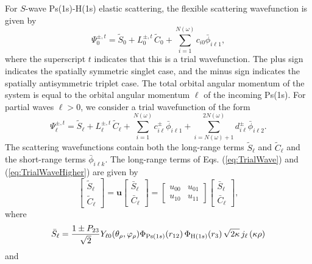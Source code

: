 \documentclass[preprint,showpacs,showkeys,preprintnumbers,amsmath,amssymb,longbibliography,pra,aps]{revtex4-1}
\begin{document}
For $S$-wave Ps(1s)-H(1s) elastic scattering, the flexible scattering
wavefunction is given by
\begin{equation}
\Psi_0^{\pm,t} = \widetilde{S}_0 + L_0^{\pm,t} \, \widetilde{C}_0
  + \sum_{i=1}^{N(\omega)} c_{i0} \bar{\phi}_{i\ell 1},
\label{eq:TrialWave}
\end{equation}
where the superscript $t$ indicates that this is a trial wavefunction. The plus
sign indicates the spatially symmetric singlet case, and the minus sign
indicates the spatially antisymmetric triplet case. The total orbital angular
momentum of the system is equal to the orbital angular momentum $\ell$ 
of the incoming Ps(1s). For partial waves $\ell > 0$, we consider a trial
wavefunction of the form
\begin{equation}
\Psi_\ell^{\pm,t} = \widetilde{S}_\ell + L^{\pm,t}_\ell \, \widetilde{C}_\ell
 + \sum_{i=1}^{N(\omega)} c_{i\ell}^\pm \bar{\phi}_{i\ell 1}
 + \!\!\!\sum_{i=N(\omega)+1}^{2N(\omega)} \!\! d_{i\ell}^\pm \bar{\phi}_{i\ell 2}.
\label{eq:TrialWaveHigher}
\end{equation}
The scattering wavefunctions contain both the long-range terms $\widetilde{S}_\ell$
and $\widetilde{C}_\ell$ and the short-range terms $\bar{\phi}_{i\ell k}$. The 
long-range terms of Eqs. (\ref{eq:TrialWave}) and (\ref{eq:TrialWaveHigher})
are given by
\begin{equation}
\label{eq:SCPhiDef}
\begin{bmatrix}
\widetilde{S}_\ell \\ \widetilde{C}_\ell
\end{bmatrix} = \textbf{u}  \begin{bmatrix}
\bar{S}_\ell \\ \bar{C}_\ell
\end{bmatrix} = \begin{bmatrix}
u_{00} & u_{01} \\  u_{10} & u_{11}
\end{bmatrix}
\begin{bmatrix}
\bar{S}_\ell \\ \bar{C}_\ell
\end{bmatrix}, 
\end{equation}
where
\begin{equation}
\label{eq:SBar}
\bar{S}_\ell = \frac{1\pm P_{23}}{\sqrt{2}}Y_{\ell 0}(\theta_\rho,
  \varphi_\rho)\Phi_{{\rm{Ps}}(1s)}\!\left(r_{12}\right) \Phi_{{\rm{H}}(1s)}\!\left(r_3\right)
  \sqrt{2\kappa} \,j_\ell\left(\kappa\rho\right)
\end{equation}
and
\end{document}
